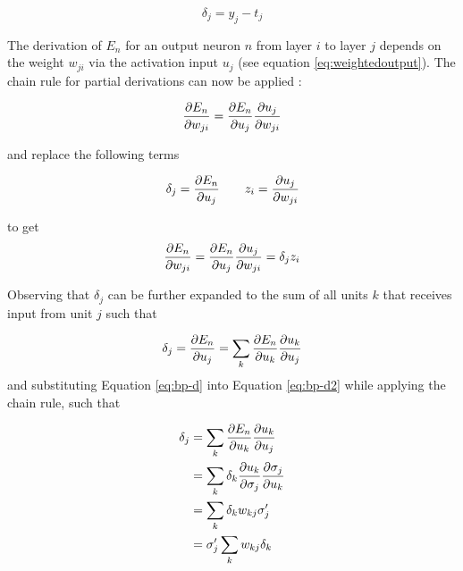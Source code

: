 \documentclass[report.tex]{subfiles}
\begin{document}
\begin{equation}
  \delta_j = y_j - t_j
  \label{eq:bp-loss-prime}
\end{equation}

The derivation of $E_n$ for an output neuron $n$ from layer $i$ to layer $j$
depends on the weight $w_{ji}$ via the activation input $u_j$ (see equation
\ref{eq:weightedoutput}).
The chain rule for partial derivations can now be applied \cite{Bishop2006}:

\begin{equation}
  {\partial E_n \over \partial w_{ji} } =
  { \partial E_n \over \partial u_j}
  {\partial u_j \over \partial w_{ji}}
  \label{eq:bp-chain}
\end{equation}

and replace the following terms

\begin{equation}
  \delta_j = 
  { \partial E_n \over \partial u_j}
  \qquad
  z_i = { \partial u_j \over \partial w_{ji}}
  \label{eq:bp-d}
\end{equation}

to get 
\begin{equation}
  {\partial E_n \over \partial w_{ji} } =
  { \partial E_n \over \partial u_j}
  {\partial u_j \over \partial w_{ji}} = 
  \delta_j z_i
  \label{eq:bp-chain2}
\end{equation}

Observing that $\delta_j$ can be further expanded to the sum of all units $k$
that receives input from unit $j$ such that

\begin{equation}
  \delta_j = {\partial E_n \over \partial u_j} =
  \sum_k {\partial E_n \over \partial u_k} 
  {\partial u_k \over \partial u_j}
  \label{eq:bp-d2}
\end{equation}
\noindent
and substituting Equation \ref{eq:bp-d} into Equation \ref{eq:bp-d2} while applying the chain rule, such that

\begin{equation}
  \begin{split}
  \delta_j & = \sum_k {\partial E_n \over \partial u_k} 
   {\partial u_k \over \partial u_j} \\
   & = \sum_k \delta_k {\partial u_k \over \partial \sigma_j} {\partial \sigma_j \over \partial u_k} \\
   & = \sum_k \delta_k w_{kj} \sigma'_j \\
   & = \sigma'_j \sum_k w_{kj} \delta_k 
  \end{split}
  \label{eq:bp}
\end{equation}
\end{document}
